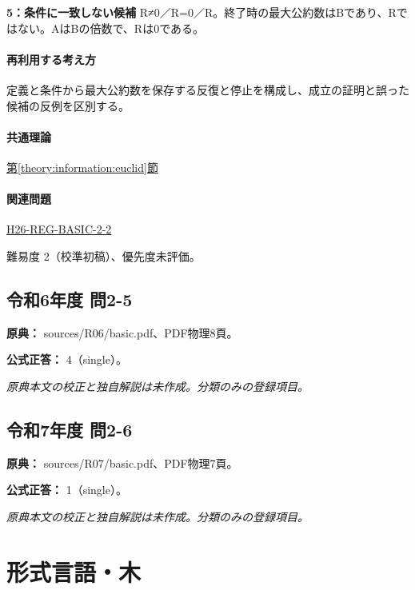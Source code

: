 \noindent\textbf{5：条件に一致しない候補} R≠0／R=\allowbreak{}0／R。終了時の最大公約数はBであり、Rではない。AはBの倍数で、Rは0である。\par

\paragraph{再利用する考え方} 定義と条件から最大公約数を保存する反復と停止を構成し、成立の証明と誤った候補の反例を区別する。

\paragraph{共通理論} \hyperref[theory:information:euclid]{第\ref*{theory:information:euclid}節}

\paragraph{関連問題} \hyperref[q:h26-reg-basic-2-2]{H26-REG-BASIC-2-2}

\par 難易度 2（校準初稿）、優先度未評価。

\subsection{令和6年度 問2-5}
\label{q:r06-reg-basic-2-5}

\noindent\textbf{原典：} sources/R06/basic.pdf、PDF物理8頁。

\textbf{公式正答：} 4（single）。

\par\textit{原典本文の校正と独自解説は未作成。分類のみの登録項目。}

\subsection{令和7年度 問2-6}
\label{q:r07-reg-basic-2-6}

\noindent\textbf{原典：} sources/R07/basic.pdf、PDF物理7頁。

\textbf{公式正答：} 1（single）。

\par\textit{原典本文の校正と独自解説は未作成。分類のみの登録項目。}

\section{形式言語・木}

